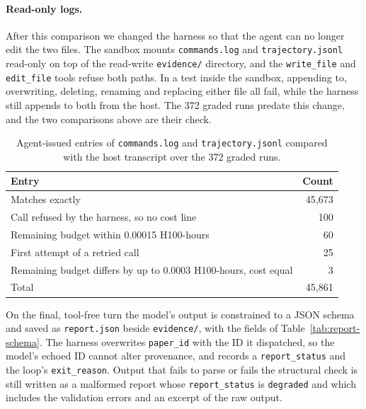 \paragraph{Read-only logs.} After this comparison we changed the harness so
that the agent can no longer edit the two files. The sandbox mounts
\texttt{commands.log} and \texttt{trajectory.jsonl} read-only on top of the
read-write \texttt{evidence/} directory, and the \texttt{write\_file} and
\texttt{edit\_file} tools refuse both paths. In a test inside the sandbox,
appending to, overwriting, deleting, renaming and replacing either file all
fail, while the harness still appends to both from the host. The 372 graded
runs predate this change, and the two comparisons above are their check.

\begin{table}[ht]
\centering
\small
\begin{tabular}{@{}lr@{}}
\toprule
Entry & Count \\
\midrule
Matches exactly & 45,673 \\
Call refused by the harness, so no cost line & 100 \\
Remaining budget within 0.00015 H100-hours & 60 \\
First attempt of a retried call & 25 \\
Remaining budget differs by up to 0.0003 H100-hours, cost equal & 3 \\
\midrule
Total & 45,861 \\
\bottomrule
\end{tabular}
\caption{Agent-issued entries of \texttt{commands.log} and \texttt{trajectory.jsonl}
compared with the host transcript over the 372 graded runs.}
\label{tab:log-check}
\end{table}

On the final, tool-free turn the model's output is constrained to a JSON
schema and saved as \texttt{report.json} beside \texttt{evidence/}, with the
fields of Table~\ref{tab:report-schema}. The harness overwrites
\texttt{paper\_id} with the ID it dispatched, so the model's echoed ID cannot
alter provenance, and records a
\texttt{report\_status} and the loop's
\texttt{exit\_reason}. Output that fails to parse or fails the structural
check is still written as a malformed report whose \texttt{report\_status} is
\texttt{degraded} and which includes the validation errors and an excerpt of
the raw output.

